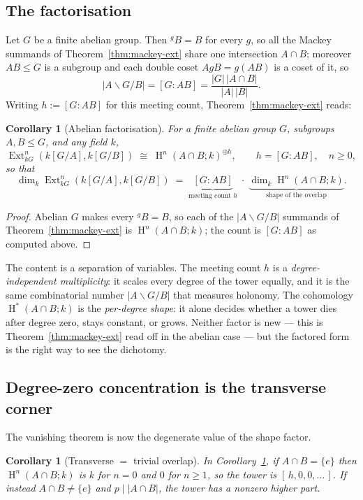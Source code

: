 \documentclass[11pt]{amsart}
\theoremstyle{plain}
\newtheorem{corollary}[theorem]{Corollary}
\theoremstyle{definition}
\DeclareMathOperator{\Ext}{Ext}
\DeclareMathOperator{\Hh}{H}
\newcommand{\conj}[2]{{}^{#1}\!#2}
\newcommand{\dcoset}[3]{#1\backslash #2/#3}
\begin{document}
\subsection{The factorisation}
Let $G$ be a finite abelian group. Then $\conj{g}{B}=B$ for every $g$, so all the Mackey
summands of Theorem~\ref{thm:mackey-ext} share one intersection $A\cap B$; moreover
$AB\le G$ is a subgroup and each double coset $AgB=g(AB)$ is a coset of it, so
\[
   \lvert\dcoset{A}{G}{B}\rvert=[G:AB]=\frac{\lvert G\rvert\,\lvert A\cap B\rvert}
   {\lvert A\rvert\,\lvert B\rvert}.
\]
Writing $h:=[G:AB]$ for this meeting count, Theorem~\ref{thm:mackey-ext} reads:

\begin{corollary}[Abelian factorisation]\label{cor:abelian-factor}
For a finite abelian group $G$, subgroups $A,B\le G$, and any field $k$,
\[
   \Ext^n_{kG}(k[G/A],k[G/B])\;\cong\;\Hh^n(A\cap B;k)^{\oplus h},
   \qquad h=[G:AB],\quad n\ge 0,
\]
so that
\[
   \dim_k\Ext^n_{kG}(k[G/A],k[G/B])\;=\;
   \underbrace{[G:AB]}_{\text{meeting count }h}\;\cdot\;
   \underbrace{\dim_k\Hh^n(A\cap B;k)}_{\text{shape of the overlap}} .
\]
\end{corollary}
\begin{proof}
Abelian $G$ makes every $\conj{g}{B}=B$, so each of the $\lvert\dcoset{A}{G}{B}\rvert$
summands of Theorem~\ref{thm:mackey-ext} is $\Hh^n(A\cap B;k)$; the count is $[G:AB]$ as
computed above.
\end{proof}

The content is a separation of variables. The meeting count $h$ is a
\emph{degree-independent multiplicity}: it scales every degree of the tower equally, and
it is the same combinatorial number $\lvert\dcoset{A}{G}{B}\rvert$ that measures holonomy.
The cohomology $\Hh^*(A\cap B;k)$ is the \emph{per-degree shape}: it alone decides whether
a tower dies after degree zero, stays constant, or grows. Neither factor is new --- this is
Theorem~\ref{thm:mackey-ext} read off in the abelian case --- but the factored form is the
right way to see the dichotomy.

\subsection{Degree-zero concentration is the transverse corner}
The vanishing theorem is now the degenerate value of the shape factor.

\begin{corollary}[Transverse $=$ trivial overlap]\label{cor:transverse-corner}
In Corollary~\ref{cor:abelian-factor}, if $A\cap B=\{e\}$ then $\Hh^n(A\cap B;k)$ is $k$
for $n=0$ and $0$ for $n\ge 1$, so the tower is $[\,h,0,0,\dots\,]$. If instead
$A\cap B\ne\{e\}$ and $p\mid\lvert A\cap B\rvert$, the tower has a nonzero higher part.
\end{corollary}
\end{document}
